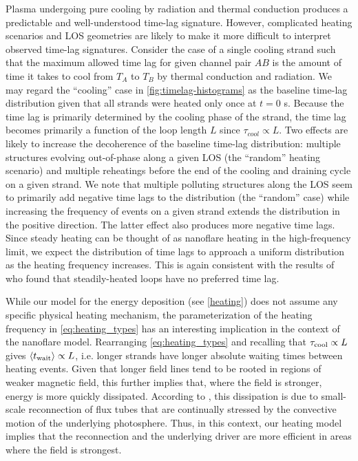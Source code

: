 Plasma undergoing pure cooling by radiation and thermal conduction produces a predictable and well-understood time-lag signature. However, complicated heating scenarios and LOS geometries are likely to make it more difficult to interpret observed time-lag signatures. Consider the case of a single cooling strand such that the maximum allowed time lag for given channel pair $AB$ is the amount of time it takes to cool from $T_A$ to $T_B$ by thermal conduction and radiation. We may regard the ``cooling'' case in \autoref{fig:timelag-histograms} as the baseline time-lag distribution given that all strands were heated only once at $t=0$ s. Because the time lag is primarily determined by the cooling phase of the strand, the time lag becomes primarily a function of the loop length $L$ since $\tau_{cool}\propto L$. Two effects are likely to increase the decoherence of the baseline time-lag distribution: multiple structures evolving out-of-phase along a given LOS (the ``random'' heating scenario) and multiple reheatings before the end of the cooling and draining cycle on a given strand. We note that multiple polluting structures along the LOS seem to primarily add negative time lags to the distribution (the ``random'' case) while increasing the frequency of events on a given strand extends the distribution in the positive direction. The latter effect also produces more negative time lags. Since steady heating can be thought of as nanoflare heating in the high-frequency limit, we expect the distribution of time lags to approach a uniform distribution as the heating frequency increases. This is again consistent with the results of \citet{viall_signatures_2016} who found that steadily-heated loops have no preferred time lag.

While our model for the energy deposition (see \autoref{heating}) does not assume any specific physical heating mechanism, the parameterization of the heating frequency in \autoref{eq:heating_types} has an interesting implication in the context of the \citet{parker_nanoflares_1988} nanoflare model. Rearranging \autoref{eq:heating_types} and recalling that $\tau_\textup{cool}\propto L$ gives $\langle t_{\textup{wait}}\rangle\propto L$, i.e. longer strands have longer absolute waiting times between heating events. Given that longer field lines tend to be rooted in regions of weaker magnetic field, this further implies that, where the field is stronger, energy is more quickly dissipated. According to \citet{parker_nanoflares_1988}, this dissipation is due to small-scale reconnection of flux tubes that are continually stressed by the convective motion of the underlying photosphere. Thus, in this context, our heating model implies that the reconnection and the underlying driver are more efficient in areas where the field is strongest.

